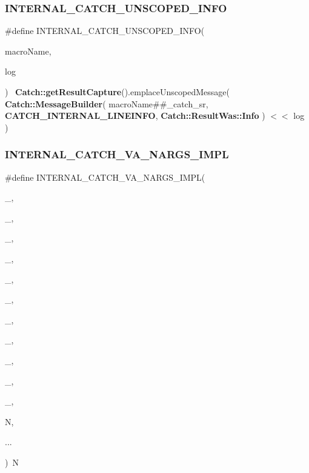 \mbox{\label{catch_8hpp_ab268c09b68167db4b163234f9934463f}} 
\subsubsection{INTERNAL\_CATCH\_UNSCOPED\_INFO}
{\footnotesize\ttfamily \#define I\+N\+T\+E\+R\+N\+A\+L\+\_\+\+C\+A\+T\+C\+H\+\_\+\+U\+N\+S\+C\+O\+P\+E\+D\+\_\+\+I\+N\+FO(\begin{DoxyParamCaption}\item[{}]{macro\+Name,  }\item[{}]{log }\end{DoxyParamCaption})~\textbf{ Catch\+::get\+Result\+Capture}().emplace\+Unscoped\+Message( \textbf{ Catch\+::\+Message\+Builder}( macro\+Name\#\#\+\_\+catch\+\_\+sr, \textbf{ C\+A\+T\+C\+H\+\_\+\+I\+N\+T\+E\+R\+N\+A\+L\+\_\+\+L\+I\+N\+E\+I\+N\+FO}, \textbf{ Catch\+::\+Result\+Was\+::\+Info} ) $<$$<$ log )}

\mbox{\label{catch_8hpp_a053a90e2d222ba1c12095556aa8db44a}} 
\subsubsection{INTERNAL\_CATCH\_VA\_NARGS\_IMPL}
{\footnotesize\ttfamily \#define I\+N\+T\+E\+R\+N\+A\+L\+\_\+\+C\+A\+T\+C\+H\+\_\+\+V\+A\+\_\+\+N\+A\+R\+G\+S\+\_\+\+I\+M\+PL(\begin{DoxyParamCaption}\item[{}]{\+\_,  }\item[{}]{\+\_,  }\item[{}]{\+\_,  }\item[{}]{\+\_,  }\item[{}]{\+\_,  }\item[{}]{\+\_,  }\item[{}]{\+\_,  }\item[{}]{\+\_,  }\item[{}]{\+\_,  }\item[{}]{\+\_,  }\item[{}]{\+\_,  }\item[{}]{N,  }\item[{}]{... }\end{DoxyParamCaption})~N}

